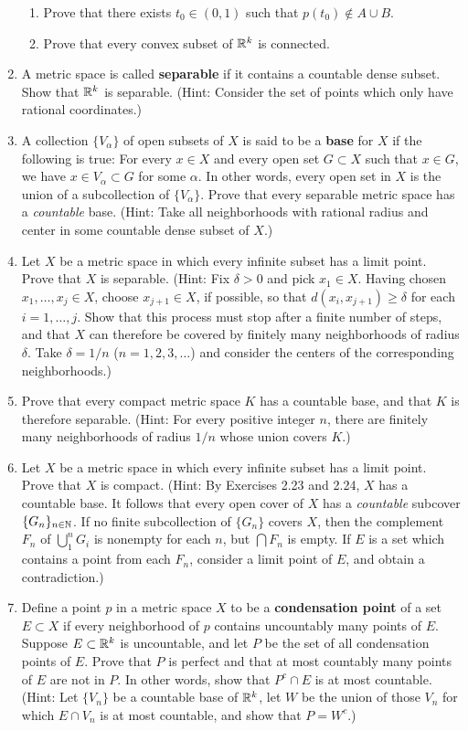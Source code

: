 \documentclass[../psets.tex]{subfiles}
\begin{document}
\begin{enumerate}[label={\textbf{\arabic*.}}]
\begin{enumerate}
        \item Prove that there exists $t_0\in(0,1)$ such that $p(t_0)\notin A\cup B$.
        \item Prove that every convex subset of $\mathbb{R}^k$ is connected.
    \end{enumerate}
    \item A metric space is called \textbf{separable} if it contains a countable dense subset. Show that $\mathbb{R}^k$ is separable. (Hint: Consider the set of points which only have rational coordinates.)
    \item A collection $\{V_\alpha\}$ of open subsets of $X$ is said to be a \textbf{base} for $X$ if the following is true: For every $x\in X$ and every open set $G\subset X$ such that $x\in G$, we have $x\in V_\alpha\subset G$ for some $\alpha$. In other words, every open set in $X$ is the union of a subcollection of $\{V_\alpha\}$. Prove that every separable metric space has a \emph{countable} base. (Hint: Take all neighborhoods with rational radius and center in some countable dense subset of $X$.)
    \item Let $X$ be a metric space in which every infinite subset has a limit point. Prove that $X$ is separable. (Hint: Fix $\delta>0$ and pick $x_1\in X$. Having chosen $x_1,\dots,x_j\in X$, choose $x_{j+1}\in X$, if possible, so that $d(x_i,x_{j+1})\geq\delta$ for each $i=1,\dots,j$. Show that this process must stop after a finite number of steps, and that $X$ can therefore be covered by finitely many neighborhoods of radius $\delta$. Take $\delta=1/n$ ($n=1,2,3,\dots$) and consider the centers of the corresponding neighborhoods.)
    \item Prove that every compact metric space $K$ has a countable base, and that $K$ is therefore separable. (Hint: For every positive integer $n$, there are finitely many neighborhoods of radius $1/n$ whose union covers $K$.)
    \item Let $X$ be a metric space in which every infinite subset has a limit point. Prove that $X$ is compact. (Hint: By Exercises 2.23 and 2.24, $X$ has a countable base. It follows that every open cover of $X$ has a \emph{countable} subcover $\{G_n\}_{n\in\mathbb{N}}$. If no finite subcollection of $\{G_n\}$ covers $X$, then the complement $F_n$ of $\bigcup_1^nG_i$ is nonempty for each $n$, but $\bigcap F_n$ is empty. If $E$ is a set which contains a point from each $F_n$, consider a limit point of $E$, and obtain a contradiction.)
    \item Define a point $p$ in a metric space $X$ to be a \textbf{condensation point} of a set $E\subset X$ if every neighborhood of $p$ contains uncountably many points of $E$. Suppose $E\subset\mathbb{R}^k$ is uncountable, and let $P$ be the set of all condensation points of $E$. Prove that $P$ is perfect and that at most countably many points of $E$ are not in $P$. In other words, show that $P^c\cap E$ is at most countable. (Hint: Let $\{V_n\}$ be a countable base of $\mathbb{R}^k$, let $W$ be the union of those $V_n$ for which $E\cap V_n$ is at most countable, and show that $P=W^c$.)

\end{enumerate}
\end{document}
